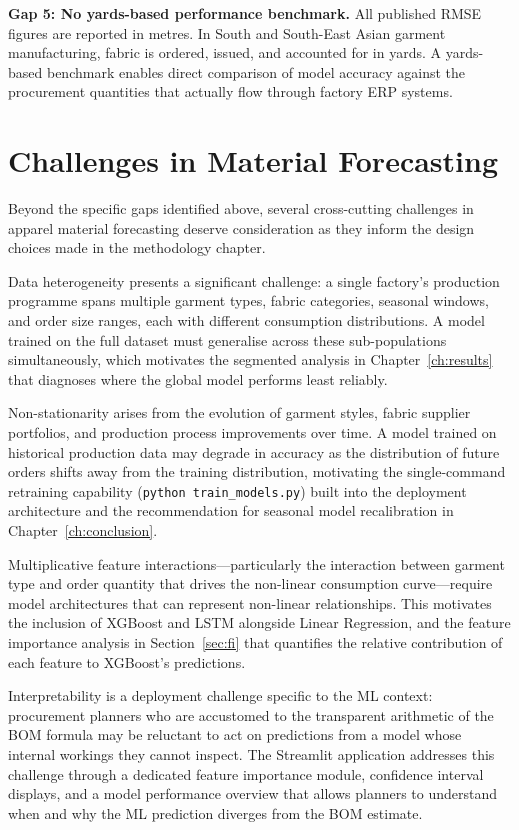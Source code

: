 \textbf{Gap 5: No yards-based performance benchmark.} All published RMSE figures are reported in metres. In South and South-East Asian garment manufacturing, fabric is ordered, issued, and accounted for in yards. A yards-based benchmark enables direct comparison of model accuracy against the procurement quantities that actually flow through factory ERP systems.

\secdiv
\section{Challenges in Material Forecasting}
Beyond the specific gaps identified above, several cross-cutting challenges in apparel material forecasting deserve consideration as they inform the design choices made in the methodology chapter.

Data heterogeneity presents a significant challenge: a single factory's production programme spans multiple garment types, fabric categories, seasonal windows, and order size ranges, each with different consumption distributions. A model trained on the full dataset must generalise across these sub-populations simultaneously, which motivates the segmented analysis in Chapter~\ref{ch:results} that diagnoses where the global model performs least reliably.

Non-stationarity arises from the evolution of garment styles, fabric supplier portfolios, and production process improvements over time. A model trained on historical production data may degrade in accuracy as the distribution of future orders shifts away from the training distribution, motivating the single-command retraining capability (\texttt{python train\_models.py}) built into the deployment architecture and the recommendation for seasonal model recalibration in Chapter~\ref{ch:conclusion}.

Multiplicative feature interactions---particularly the interaction between garment type and order quantity that drives the non-linear consumption curve---require model architectures that can represent non-linear relationships. This motivates the inclusion of XGBoost and LSTM alongside Linear Regression, and the feature importance analysis in Section~\ref{sec:fi} that quantifies the relative contribution of each feature to XGBoost's predictions.

Interpretability is a deployment challenge specific to the ML context: procurement planners who are accustomed to the transparent arithmetic of the BOM formula may be reluctant to act on predictions from a model whose internal workings they cannot inspect. The Streamlit application addresses this challenge through a dedicated feature importance module, confidence interval displays, and a model performance overview that allows planners to understand when and why the ML prediction diverges from the BOM estimate.

